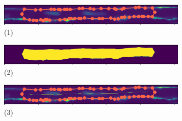 \documentclass{article}
\begin{document}
\begin{figure}
    \centering
    \begin{subfigure}{0.8 \linewidth}
    \centering
    \includegraphics[width=\linewidth]{figures/outline_before_clip.png} \\
    (1)
    \end{subfigure}
    \begin{subfigure}{0.8 \linewidth}
    \centering
    \includegraphics[width=\linewidth]{figures/Polygon_mask.png} \\
    (2)
    \end{subfigure}
    \begin{subfigure}{0.8 \linewidth}
    \centering
    \includegraphics[width=\linewidth]{figures/skeleton_with_outline.png} \\
    (3)
    \end{subfigure}
    

\end{figure}
\end{document}
